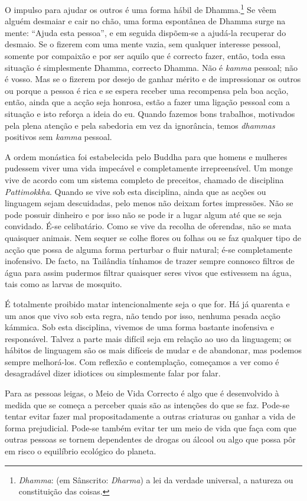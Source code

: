 O impulso para ajudar os outros é uma forma hábil de Dhamma.\footnote{%
  \emph{Dhamma}: (em Sânscrito: \emph{Dharma}) a lei da verdade universal, a
  natureza ou constituição das coisas.} Se vêem alguém desmaiar e cair no chão,
uma forma espontânea de Dhamma surge na mente: “Ajuda esta pessoa”, e em seguida
dispõem-se a ajudá-la recuperar do desmaio. Se o fizerem com uma mente vazia,
sem qualquer interesse pessoal, somente por compaixão e por ser aquilo que é
correcto fazer, então, toda essa situação é simplesmente Dhamma, correcto
Dhamma. Não é \emph{kamma} pessoal; não é vosso. Mas se o fizerem por desejo de
ganhar mérito e de impressionar os outros ou porque a pessoa é rica e se espera
receber uma recompensa pela boa acção, então, ainda que a acção seja honrosa,
estão a fazer uma ligação pessoal com a situação e isto reforça a ideia do eu.
Quando fazemos bons trabalhos, motivados pela plena atenção e pela sabedoria em
vez da ignorância, temos \emph{dhammas} positivos sem \emph{kamma} pessoal.

A ordem monástica foi estabelecida pelo Buddha para que homens e mulheres
pudessem viver uma vida impecável e completamente irrepreensível. Um monge vive
de acordo com um sistema completo de preceitos, chamado de disciplina
\emph{Pattimokkha}. Quando se vive sob esta disciplina, ainda que as acções ou
linguagem sejam descuidadas, pelo menos não deixam fortes impressões. Não se
pode possuir dinheiro e por isso não se pode ir a lugar algum até que se seja
convidado. É-se celibatário. Como se vive da recolha de oferendas, não se mata
quaisquer animais. Nem sequer se colhe flores ou folhas ou se faz qualquer tipo
de acção que possa de alguma forma perturbar o fluir natural; é-se completamente
inofensivo. De facto, na Tailândia tínhamos de trazer sempre connosco filtros de
água para assim pudermos filtrar quaisquer seres vivos que estivessem na água,
tais como as larvas de mosquito.

É totalmente proibido matar intencionalmente seja o que for. Há já quarenta e um
anos que vivo sob esta regra, não tendo por isso, nenhuma pesada acção kámmica.
Sob esta disciplina, vivemos de uma forma bastante inofensiva e responsável.
Talvez a parte mais difícil seja em relação ao uso da linguagem; os hábitos de
linguagem são os mais difíceis de mudar e de abandonar, mas podemos sempre
melhorá-los. Com reflexão e contemplação, começamos a ver como é desagradável
dizer idiotices ou simplesmente falar por falar.

Para as pessoas leigas, o Meio de Vida Correcto é algo que é desenvolvido à
medida que se começa a perceber quais são as intenções do que se faz. Pode-se
tentar evitar fazer mal propositadamente a outras criaturas ou ganhar a vida de
forma prejudicial. Pode-se também evitar ter um meio de vida que faça com que
outras pessoas se tornem dependentes de drogas ou álcool ou algo que possa pôr
em risco o equilíbrio ecológico do planeta.

